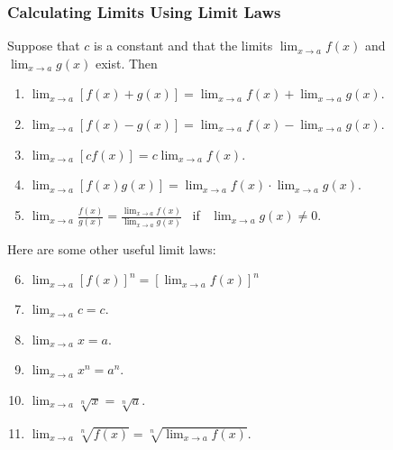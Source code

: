 \begin{frame}
\frametitle{Calculating Limits Using Limit Laws}
\begin{theorem}
Suppose that $c$ is a constant and that the limits %
$\displaystyle \lim_{x\rightarrow a} f(x)$ and $\displaystyle \lim_{x\rightarrow a}g(x)$ %
exist. Then
\begin{enumerate}
\item<1-| alert@2>  $\displaystyle \lim_{x\rightarrow a}[f(x) + g(x)] = \lim_{x\rightarrow a} f(x) + \lim_{x\rightarrow a} g(x)$.
\item<1-| alert@3>  $\displaystyle \lim_{x\rightarrow a}[f(x) - g(x)] = \lim_{x\rightarrow a} f(x) - \lim_{x\rightarrow a} g(x)$.
\item<1-| alert@4>  $\displaystyle \lim_{x\rightarrow a}[cf(x)] = c\lim_{x\rightarrow a} f(x)$. 
\item<1-| alert@5>  $\displaystyle \lim_{x\rightarrow a}[f(x)g(x)] = \lim_{x\rightarrow a} f(x) \cdot \lim_{x\rightarrow a} g(x)$.
\item<1-| alert@6>  $\displaystyle \lim_{x\rightarrow a}\frac{f(x)}{g(x)} = \frac{\lim_{x\rightarrow a} f(x)}{\lim_{x\rightarrow a} g(x)}$ \ if \ $\displaystyle \lim_{x\rightarrow a}g(x) \neq 0$.
\end{enumerate}
\end{theorem}
\alert<2->{
}
\end{frame}


\begin{frame}
Here are some other useful limit laws:

\begin{enumerate}
\setcounter{enumi}{5}
\item<1-| alert@2> $\displaystyle \lim_{x\rightarrow a} [f(x)]^n = [\lim_{x\rightarrow a} f(x)]^n$
\item<1-| alert@4> $\displaystyle \lim_{x\rightarrow a} c = c$.
\item<1-| alert@4> $\displaystyle \lim_{x\rightarrow a} x = a$.
\item<1-| alert@4> $\displaystyle \lim_{x\rightarrow a} x^n = a^n$.
\item<1-| alert@4> $\displaystyle \lim_{x\rightarrow a} \sqrt[n]{x} = \sqrt[n]{a}$.
\item<1-| alert@3> $\displaystyle \lim_{x\rightarrow a} \sqrt[n]{f(x)} = \sqrt[n]{\lim_{x\rightarrow a}f(x)}$.
\end{enumerate}
\alert{
}
\end{frame}
